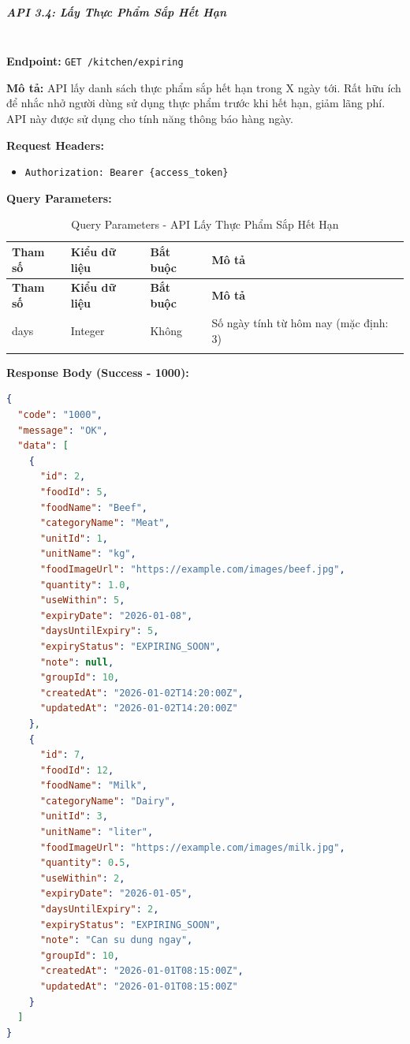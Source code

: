 \normalsize

\subparagraph{API 3.4: Lấy Thực Phẩm Sắp Hết Hạn}~\\

\textbf{Endpoint:} \texttt{GET /kitchen/expiring}

\textbf{Mô tả:} API lấy danh sách thực phẩm sắp hết hạn trong X ngày tới. Rất hữu ích để nhắc nhở người dùng sử dụng thực phẩm trước khi hết hạn, giảm lãng phí. API này được sử dụng cho tính năng thông báo hàng ngày.

\textbf{Request Headers:}
\begin{itemize}
    \item \texttt{Authorization: Bearer \{access\_token\}}
\end{itemize}

\textbf{Query Parameters:}

\small
\begin{longtable}{|>{\raggedright\arraybackslash}p{3cm}|>{\raggedright\arraybackslash}p{2.5cm}|>{\raggedright\arraybackslash}p{2cm}|>{\raggedright\arraybackslash}p{6cm}|}
\hline
\textbf{Tham số} & \textbf{Kiểu dữ liệu} & \textbf{Bắt buộc} & \textbf{Mô tả} \\
\hline
\endfirsthead
\hline
\textbf{Tham số} & \textbf{Kiểu dữ liệu} & \textbf{Bắt buộc} & \textbf{Mô tả} \\
\hline
\endhead
days & Integer & Không & Số ngày tính từ hôm nay (mặc định: 3) \\
\hline
\caption{Query Parameters - API Lấy Thực Phẩm Sắp Hết Hạn}
\end{longtable}

\textbf{Response Body (Success - 1000):}

\begin{lstlisting}[language=json, caption=Response thanh cong API 3.4]
{
  "code": "1000",
  "message": "OK",
  "data": [
    {
      "id": 2,
      "foodId": 5,
      "foodName": "Beef",
      "categoryName": "Meat",
      "unitId": 1,
      "unitName": "kg",
      "foodImageUrl": "https://example.com/images/beef.jpg",
      "quantity": 1.0,
      "useWithin": 5,
      "expiryDate": "2026-01-08",
      "daysUntilExpiry": 5,
      "expiryStatus": "EXPIRING_SOON",
      "note": null,
      "groupId": 10,
      "createdAt": "2026-01-02T14:20:00Z",
      "updatedAt": "2026-01-02T14:20:00Z"
    },
    {
      "id": 7,
      "foodId": 12,
      "foodName": "Milk",
      "categoryName": "Dairy",
      "unitId": 3,
      "unitName": "liter",
      "foodImageUrl": "https://example.com/images/milk.jpg",
      "quantity": 0.5,
      "useWithin": 2,
      "expiryDate": "2026-01-05",
      "daysUntilExpiry": 2,
      "expiryStatus": "EXPIRING_SOON",
      "note": "Can su dung ngay",
      "groupId": 10,
      "createdAt": "2026-01-01T08:15:00Z",
      "updatedAt": "2026-01-01T08:15:00Z"
    }
  ]
}
\end{lstlisting}

